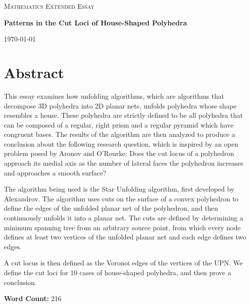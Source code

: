 \documentclass[12 pt]{article}
\begin{document}
\begin{titlepage}
\centering

	\vspace{1cm}
	{\scshape\Large Mathematics Extended Essay\par}
	\vspace{3cm}
	{\huge\bfseries Patterns in the Cut Loci of House-Shaped Polyhedra\par}
	\vfill

	{\large \today\par}
\end{titlepage}

\tableofcontents

\newpage
\graphicspath{ {Images/} }

\section*{Abstract}

This essay examines how unfolding algorithms, which are algorithms that decompose 3D polyhedra into 2D planar nets, unfolds polyhedra whose shape resembles a house. These polyhedra are strictly defined to be all polyhedra that can be composed of a regular, right prism and a regular pyramid which have congruent bases. The results of the algorithm are then analyzed to produce a conclusion about the following research question, which is inspired by an open problem posed by Aronov and O'Rourke\cite{ROURKE}: Does the cut locus of a polyhedron approach its medial axis as the number of lateral faces the polyhedron increases and approaches a smooth surface?

The algorithm being used is the Star Unfolding algorithm, first developed by Alexandrov. The algorithm uses cuts on the surface of a convex polyhedron to define the edges of the unfolded planar net of the polyhedron, and then continuously unfolds it into a planar net. The cuts are defined by determining a minimum spanning tree from an arbitrary source point, from which every node defines at least two vertices of the unfolded planar net and each edge defines two edges. 

A cut locus is then defined as the Voronoi edges of the vertices of the UPN. We define the cut loci for 10 cases of house-shaped polyhedra, and then prove a conclusion.

\textbf{Word Count:} 216

\newpage
\end{document}
